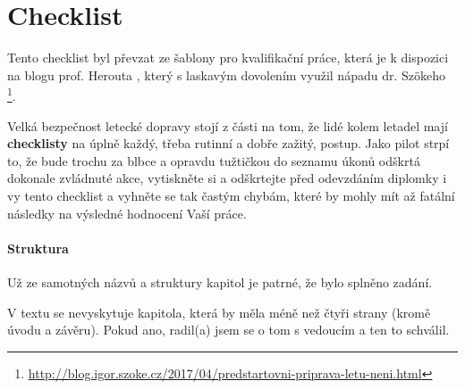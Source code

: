 
%







\chapter{Checklist} 
\label{checklist}
Tento checklist byl převzat ze šablony pro kvalifikační práce, která je k dispozici na blogu prof. Herouta \cite{Herout}, který s laskavým dovolením využil nápadu dr. Szökeho%
\footnote{\url{http://blog.igor.szoke.cz/2017/04/predstartovni-priprava-letu-neni.html}}. 

Velká bezpečnost letecké dopravy stojí z části na tom, že lidé kolem letadel mají \textbf{checklisty} na úplně každý, třeba rutinní a dobře zažitý, postup. Jako pilot strpí to, že bude trochu za blbce a opravdu tužtičkou do seznamu úkonů odškrtá dokonale zvládnuté akce, vytiskněte si a odškrtejte před odevzdáním diplomky i vy tento checklist a vyhněte se tak častým chybám, které by mohly mít až fatální následky na výsledné hodnocení Vaší práce.

\subsubsection*{Struktura}
\begin{checklist}
	\item Už ze samotných názvů a struktury kapitol je patrné, že bylo splněno zadání.
	\item V textu se nevyskytuje kapitola, která by měla méně než čtyři strany (kromě úvodu a závěru). Pokud ano, radil(a) jsem se o tom s vedoucím a ten to schválil.
\end{checklist}

